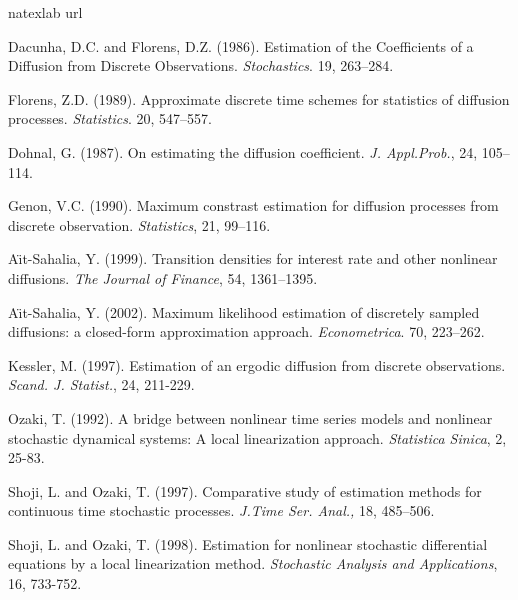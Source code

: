 \begin{thebibliography}{1}
\expandafter\ifx\csname natexlab\endcsname\relax\def\natexlab#1{#1}\fi
\expandafter\ifx\csname url\endcsname\relax
  \def\url#1{{\tt #1}}\fi

Dacunha, D.C. and Florens, D.Z. (1986).
\newblock Estimation of the Coefficients of a Diffusion from Discrete Observations.
\newblock \emph{Stochastics}. 19, 263--284.

Florens, Z.D. (1989).
\newblock Approximate discrete time schemes for statistics of diffusion processes.
\newblock \emph{Statistics}. 20, 547--557.

Dohnal, G. (1987).
\newblock On estimating the diffusion coefficient.
\newblock \emph{J. Appl.Prob.}, 24, 105--114.

Genon, V.C. (1990).
\newblock Maximum constrast estimation for diffusion processes from discrete observation.
\newblock \emph{Statistics}, 21, 99--116.

A\"{\i}t-Sahalia, Y. (1999).
\newblock Transition densities for interest rate and other nonlinear diffusions.
\newblock \emph{The Journal of Finance}, 54, 1361--1395.

A\"{\i}t-Sahalia, Y. (2002).
\newblock Maximum likelihood estimation of discretely sampled diffusions: a closed-form approximation approach.
\newblock \emph{Econometrica}. 70, 223--262.

Kessler, M. (1997).
\newblock Estimation of an ergodic diffusion from discrete observations.
\newblock \emph{Scand. J. Statist.}, 24, 211-229.

Ozaki, T. (1992).
\newblock A bridge between nonlinear time series models and nonlinear stochastic dynamical systems: A local linearization approach.
\newblock \emph{Statistica Sinica}, 2, 25-83.

Shoji, L. and Ozaki, T. (1997).
\newblock Comparative study of estimation methods for continuous time stochastic processes.
\newblock \emph{J.Time Ser. Anal.,} 18, 485--506.

Shoji, L. and Ozaki, T. (1998).
\newblock  Estimation for nonlinear stochastic differential equations by a local linearization method.
\newblock  \emph{Stochastic Analysis and Applications}, 16, 733-752.


\end{thebibliography}
